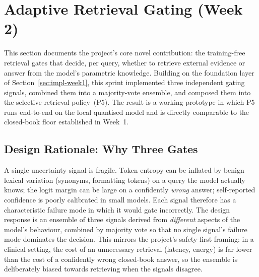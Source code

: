 %
%

\section{Adaptive Retrieval Gating (Week 2)}
\label{sec:impl-week2}

This section documents the project's core novel contribution: the
training-free retrieval gates that decide, per query, whether to retrieve
external evidence or answer from the model's parametric knowledge. Building on
the foundation layer of Section~\ref{sec:impl-week1}, this sprint implemented
three independent gating signals, combined them into a majority-vote ensemble,
and composed them into the selective-retrieval policy~(P5). The result is a
working prototype in which P5 runs end-to-end on the local quantised model and
is directly comparable to the closed-book floor established in Week~1.

\subsection{Design Rationale: Why Three Gates}
\label{sec:gate-rationale}

A single uncertainty signal is fragile. Token entropy can be inflated by
benign lexical variation (synonyms, formatting tokens) on a query the model
actually knows; the logit margin can be large on a confidently \emph{wrong}
answer; self-reported confidence is poorly calibrated in small models. Each
signal therefore has a characteristic failure mode in which it would gate
incorrectly. The design response is an ensemble of three signals derived from
\emph{different} aspects of the model's behaviour, combined by majority vote so
that no single signal's failure mode dominates the decision. This mirrors the
project's safety-first framing: in a clinical setting, the cost of an
unnecessary retrieval (latency, energy) is far lower than the cost of a
confidently wrong closed-book answer, so the ensemble is deliberately biased
towards retrieving when the signals disagree.

